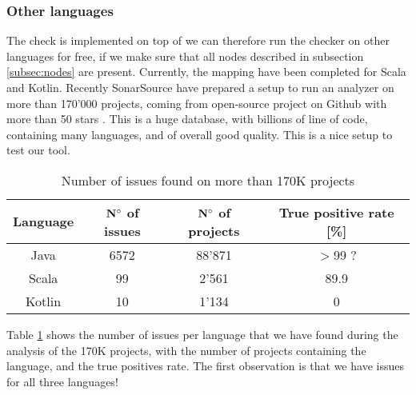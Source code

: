 \subsubsection{Other languages}
\label{subsubsec:other_languages}
The check is implemented on top of \slang{} we can therefore run the checker on other languages for free, if we make sure that all nodes described in subsection \ref{subsec:nodes} are present. 
Currently, the mapping have been completed for Scala and Kotlin.
Recently SonarSource have prepared a setup to run an analyzer on more than 170'000 projects, coming from open-source project on Github with more than 50 stars \cite{sourced:2019:Online}. 
This is a huge database, with billions of line of code, containing many languages, and of overall good quality. 
This is a nice setup to test our tool.

\begin{table}[h]
	\centering
	\caption{Number of issues found on more than 170K projects}
	\label{table:large_scale_issues}
	\begin{tabular}{|c|c|c|c|}
		\hline
		\bf Language & \bf $\bf N^{\circ}$ of issues & \bf $\bf N^{\circ}$  of projects & \bf True positive rate [\%] \\ \hline
		Java & 6572 & 88'871 & $>$99 ? \\
		Scala & 99 & 2'561 & 89.9 \\
		Kotlin & 10 & 1'134 & 0 \\ \hline
	\end{tabular}
\end{table}

Table \ref{table:large_scale_issues} shows the number of issues per language that we have found during the analysis of the 170K projects, with the number of projects containing the language, and the true positives rate.
The first observation is that we have issues for all three languages!

